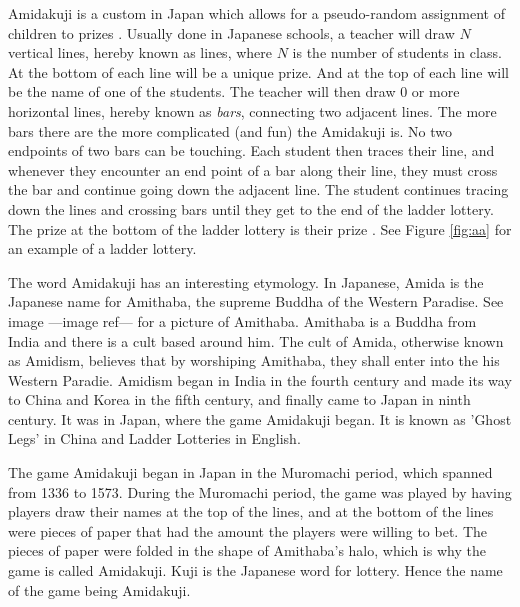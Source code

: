 
Amidakuji is a custom in Japan which 
allows for a pseudo-random assignment of children to prizes \cite{A23}. 
Usually done in Japanese schools, a teacher will draw $N$ vertical lines, 
hereby known as lines, where $N$ is the number of students in class. 
At the bottom of each line will be a unique prize. 
And at the top of each line will be the name of one of the students.  
The teacher will then draw 0 or more horizontal lines, hereby known as \emph{bars}, 
connecting two adjacent lines. The more bars there are the more complicated (and fun) 
the Amidakuji is. No two endpoints of two bars can be touching. Each student then traces 
their line, and whenever they encounter an end point of a bar along their line, 
they must cross the bar and continue going down the adjacent line. 
The student continues tracing down the lines and crossing bars 
until they get to the end of the ladder lottery. The prize at the bottom of the ladder lottery 
is their prize \cite{A7}. See Figure \ref{fig:aa} for an example of a ladder lottery.\par
The word Amidakuji has an interesting etymology. In Japanese, Amida is the Japanese name 
for Amithaba, the supreme Buddha of the Western Paradise. See image ---image ref---
for a picture of Amithaba. Amithaba
is a Buddha from India and there is a cult based around him. The cult 
of Amida, otherwise known as Amidism, believes that by worshiping Amithaba, they shall 
enter into the his Western Paradie. Amidism began in India in the fourth century
and made its way to China and Korea in the fifth century, and finally  came 
to Japan in ninth century. It was in Japan, where the game Amidakuji
began. It is known as 'Ghost Legs' in China and Ladder Lotteries in English.\par
The game Amidakuji began in Japan in the Muromachi period, which spanned from
1336 to 1573. During the Muromachi period, the game was played by having
players draw their names at the top of the lines, and at the bottom 
of the lines were pieces of paper that had the amount the players
were willing to bet. The pieces of paper were folded in the shape of 
Amithaba's halo, which is why the game is called Amidakuji. Kuji 
is the Japanese word for lottery. Hence the name of the game being 
Amidakuji.\par 

